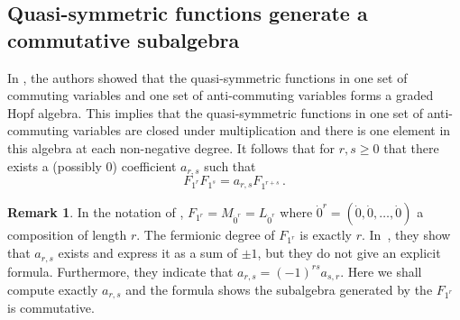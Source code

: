 \documentclass[11pt]{amsart}
\theoremstyle{definition}
\newtheorem{remark}[theorem]{Remark}
\numberwithin{equation}{section}
\begin{document}
\subsection{Quasi-symmetric functions generate a commutative subalgebra}
In \cite{FLP}, the authors showed that the quasi-symmetric functions in
one set of commuting variables and one set of anti-commuting variables
forms a graded Hopf algebra.  This implies that the quasi-symmetric functions
in one set of anti-commuting variables are closed under multiplication
and there is one element in this algebra at each non-negative degree.
It follows that for $r, s \geq0$ that there exists a (possibly $0$)
coefficient $a_{r,s}$ such that
\begin{equation}\label{eq:qsalg}
F_{1^r} F_{1^s} = a_{r,s} F_{1^{r+s}}\,.
\end{equation}

\begin{remark}
In  the notation of \cite{FLP}, $F_{1^r}=M_{\dot{0}^r}=L_{\dot{0}^r}$ where $\dot{0}^r=(\dot{0},\dot{0},\ldots,\dot{0})$ a composition of length $r$.
The fermionic degree of $F_{1^r}$ is exactly $r$.
 In~\cite{FLP}, they show that $a_{r,s}$ exists and express it as a sum of $\pm 1$, but they do not give an explicit formula.
Furthermore, they indicate  that $a_{r,s}=(-1)^{rs}a_{s,r}$. Here we shall compute exactly $a_{r,s}$
and the formula shows the subalgebra generated by the $F_{1^r}$ is commutative.
\end{remark}
\end{document}
